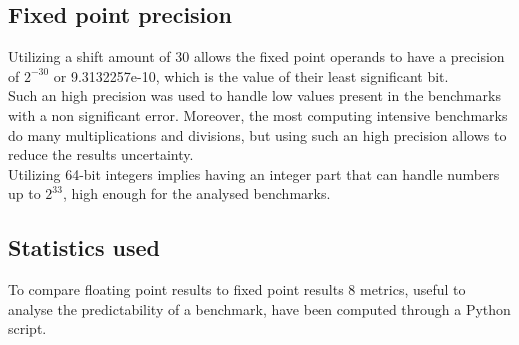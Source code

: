 \subsection{Fixed point precision}
Utilizing a shift amount of 30 allows the fixed point operands to have a precision of ${2}^{-30}$ or 9.3132257e-10, which is the value of their least significant bit.\\
Such an high precision was used to handle low values present in the benchmarks with a non significant error. Moreover, the most computing intensive benchmarks do many multiplications and divisions, but using such an high precision allows to reduce the results uncertainty.\\
Utilizing 64-bit integers implies having an integer part that can handle numbers up to ${2}^{33}$, high enough for the analysed benchmarks.
\subsection{Statistics used}
To compare floating point results to fixed point results 8 metrics, useful to analyse the predictability of a benchmark, have been computed through a Python script.

